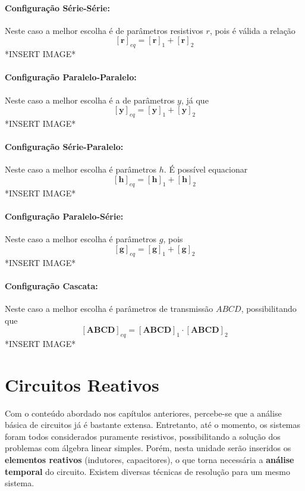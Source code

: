 \documentclass{article}
\numberwithin{equation}{section}
\begin{document}
    \paragraph{Configuração Série-Série:}
    Neste caso a melhor escolha é de parâmetros resistivos $r$, pois é válida a relação
        $$ [\textbf{r}]_{eq} = [\textbf{r}]_{1} + [\textbf{r}]_{2} $$
        *INSERT IMAGE*

    \paragraph{Configuração Paralelo-Paralelo:}
    Neste caso a melhor escolha é a de parâmetros $y$, já que
        $$ [\textbf{y}]_{eq} = [\textbf{y}]_{1} + [\textbf{y}]_{2} $$
        *INSERT IMAGE*

    \paragraph{Configuração Série-Paralelo:}
    Neste caso a melhor escolha é parâmetros $h$. É possível equacionar
        $$ [\textbf{h}]_{eq} = [\textbf{h}]_{1} + [\textbf{h}]_{2} $$
        *INSERT IMAGE*

    \paragraph{Configuração Paralelo-Série:}
    Neste caso a melhor escolha é parâmetros $g$, pois
        $$ [\textbf{g}]_{eq} = [\textbf{g}]_{1} + [\textbf{g}]_{2} $$
        *INSERT IMAGE*

    \paragraph{Configuração Cascata:}
    Neste caso a melhor escolha é parâmetros de transmissão $ABCD$, possibilitando que
        $$ [\textbf{ABCD}]_{eq} = [\textbf{ABCD}]_{1} \cdot [\textbf{ABCD}]_{2} $$
        *INSERT IMAGE*

    \newpage



    \section{Circuitos Reativos}
    \label{sec:reativos}
    Com o conteúdo abordado nos capítulos anteriores, percebe-se que a análise básica de circuitos já é bastante extensa. Entretanto, até o momento, os sistemas foram todos considerados puramente resistivos, possibilitando a solução dos problemas com álgebra linear simples. Porém, nesta unidade serão inseridos os \textbf{elementos reativos} (indutores, capacitores), o que torna necessária a \textbf{análise temporal} do circuito. Existem diversas técnicas de resolução para um mesmo sistema.
\end{document}
